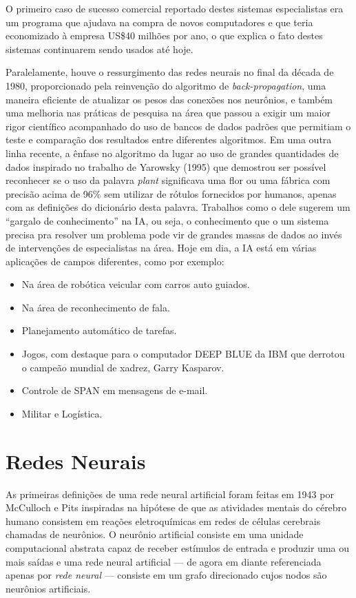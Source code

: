 O primeiro caso de sucesso comercial reportado destes sistemas especialistas
era um programa que ajudava na compra de novos computadores e que teria
economizado à empresa US\$40 milhões por ano, o que explica o fato destes
sistemas continuarem sendo usados até hoje.

Paralelamente, houve o ressurgimento das redes neurais no final da década de
1980, proporcionado pela reinvenção do algoritmo de \emph{back-propagation},
uma maneira eficiente de atualizar os pesos das conexões nos neurônios, e
também uma melhoria nas práticas de pesquisa na área que passou a exigir um
maior rigor científico acompanhado do uso de bancos de dados padrões que
permitiam o teste e comparação dos resultados entre diferentes algoritmos. Em
uma outra linha recente, a ênfase no algoritmo da lugar ao uso de grandes
quantidades de dados inspirado no trabalho de Yarowsky (1995) que demostrou ser
possível reconhecer se o uso da palavra \emph{plant} significava uma flor ou uma
fábrica com precisão acima de 96\% sem utilizar de rótulos fornecidos por
humanos, apenas com as definições do dicionário desta palavra. Trabalhos como o
dele sugerem um ``gargalo de conhecimento'' na IA, ou seja, o conhecimento que
o um sistema precisa pra resolver um problema pode vir de grandes massas de
dados ao invés de intervenções de especialistas na área. Hoje em dia, a IA está
em várias aplicações de campos diferentes, como por exemplo:

\begin{itemize}
\itemsep1pt\parskip0pt
\item
  Na área de robótica veicular com carros auto guiados.
\item
  Na área de reconhecimento de fala.
\item
  Planejamento automático de tarefas.
\item
  Jogos, com destaque para o computador DEEP BLUE da IBM que derrotou o
  campeão mundial de xadrez, Garry Kasparov.
\item
  Controle de SPAN em mensagens de e-mail.
\item
  Militar e Logística.
\end{itemize}

\section{Redes Neurais}

As primeiras definições de uma rede neural artificial foram feitas em 1943 por
McCulloch e Pits inspiradas na hipótese de que as atividades mentais do cérebro
humano consistem em reações eletroquímicas em redes de células cerebrais
chamadas de neurônios. O neurônio artificial consiste em uma unidade
computacional abstrata capaz de receber estímulos de entrada e produzir uma ou
mais saídas e uma rede neural artificial --- de agora em diante referenciada
apenas por \emph{rede neural} --- consiste em um grafo direcionado cujos nodos
são neurônios artificiais.

